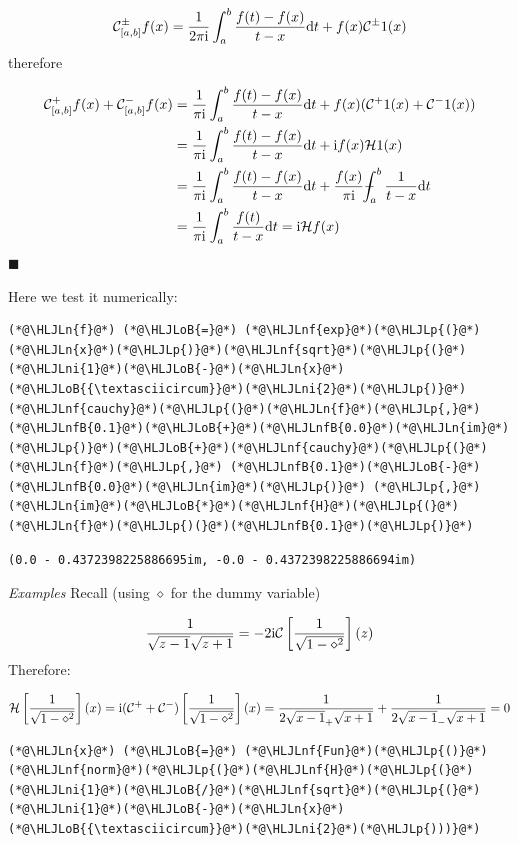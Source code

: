 \documentclass[12pt,a4paper]{article}
\newcommand{\HLJLn}[1]{#1}
\newcommand{\HLJLnf}[1]{\textcolor[RGB]{66,102,213}{#1}}
\newcommand{\HLJLnfB}[1]{\textcolor[RGB]{59,151,46}{#1}}
\newcommand{\HLJLni}[1]{\textcolor[RGB]{59,151,46}{#1}}
\newcommand{\HLJLoB}[1]{\textcolor[RGB]{102,102,102}{\textbf{#1}}}
\newcommand{\HLJLp}[1]{#1}
\def\D{ {\rm d} }
\def\I{ {\rm i} }
\def\CC{ {\cal C} }
\def\HH{ {\cal H} }
\def\Xint#1{ \mathchoice
   {\XXint\displaystyle\textstyle{#1} }%
   {\XXint\textstyle\scriptstyle{#1} }%
   {\XXint\scriptstyle\scriptscriptstyle{#1} }%
   {\XXint\scriptscriptstyle\scriptscriptstyle{#1} }%
   \!\int}
\def\XXint#1#2#3{ {\setbox0=\hbox{$#1{#2#3}{\int}$}
     \vcenter{\hbox{$#2#3$}}\kern-.5\wd0} }
\def\dashint{\Xint-}
\def\dt{\D t}
\begin{document}
\[
\CC_{[a,b]}^\pm f(x) = {1 \over 2 \pi \I} \int_a^b {f(t) - f(x) \over t-x} \dt + f(x) \CC^\pm 1(x)
\]
therefore


\begin{align*}
\CC_{[a,b]}^+ f(x) + \CC_{[a,b]}^- f(x) &= {1 \over \pi \I} \int_a^b {f(t) - f(x) \over t-x} \dt + f(x) (\CC^+ 1(x) + \CC^- 1(x) ) \\
    & = {1 \over \pi \I} \int_a^b {f(t) - f(x) \over t-x} \dt + \I  f(x) \HH 1(x)\\
    & = {1 \over \pi \I} \int_a^b {f(t) - f(x) \over t-x} \dt + {f(x)  \over \pi \I }\dashint_a^b  { 1\over t - x} \dt \\
    & = {1 \over \pi \I} \int_a^b {f(t) \over t-x} \dt =  \I \HH f(x)
\end{align*}
\ensuremath{\blacksquare}

Here we test it numerically:


\begin{lstlisting}
(*@\HLJLn{f}@*) (*@\HLJLoB{=}@*) (*@\HLJLnf{exp}@*)(*@\HLJLp{(}@*)(*@\HLJLn{x}@*)(*@\HLJLp{)}@*)(*@\HLJLnf{sqrt}@*)(*@\HLJLp{(}@*)(*@\HLJLni{1}@*)(*@\HLJLoB{-}@*)(*@\HLJLn{x}@*)(*@\HLJLoB{{\textasciicircum}}@*)(*@\HLJLni{2}@*)(*@\HLJLp{)}@*)
(*@\HLJLnf{cauchy}@*)(*@\HLJLp{(}@*)(*@\HLJLn{f}@*)(*@\HLJLp{,}@*) (*@\HLJLnfB{0.1}@*)(*@\HLJLoB{+}@*)(*@\HLJLnfB{0.0}@*)(*@\HLJLn{im}@*)(*@\HLJLp{)}@*)(*@\HLJLoB{+}@*)(*@\HLJLnf{cauchy}@*)(*@\HLJLp{(}@*)(*@\HLJLn{f}@*)(*@\HLJLp{,}@*) (*@\HLJLnfB{0.1}@*)(*@\HLJLoB{-}@*)(*@\HLJLnfB{0.0}@*)(*@\HLJLn{im}@*)(*@\HLJLp{)}@*) (*@\HLJLp{,}@*) (*@\HLJLn{im}@*)(*@\HLJLoB{*}@*)(*@\HLJLnf{H}@*)(*@\HLJLp{(}@*)(*@\HLJLn{f}@*)(*@\HLJLp{)(}@*)(*@\HLJLnfB{0.1}@*)(*@\HLJLp{)}@*)
\end{lstlisting}

\begin{lstlisting}
(0.0 - 0.4372398225886695im, -0.0 - 0.4372398225886694im)
\end{lstlisting}


\emph{Examples} Recall  (using $\diamond$ for the dummy variable)

\[
{1 \over \sqrt{z-1} \sqrt{z+1}} = -2 \I {\cal C}\left[{1 \over \sqrt{1-\diamond^2}}\right](z)
\]
Therefore:

\[
{\cal H}\left[{1 \over \sqrt{1-\diamond^2}}\right](x) = \I (\CC^+  + \CC^-) \left[{1 \over \sqrt{1-\diamond^2}}\right](x) = {1 \over 2  \sqrt{x-1}_+ \sqrt{x+1}} + {1 \over 2  \sqrt{x-1}_- \sqrt{x+1}} = 0
\]

\begin{lstlisting}
(*@\HLJLn{x}@*) (*@\HLJLoB{=}@*) (*@\HLJLnf{Fun}@*)(*@\HLJLp{()}@*)
(*@\HLJLnf{norm}@*)(*@\HLJLp{(}@*)(*@\HLJLnf{H}@*)(*@\HLJLp{(}@*)(*@\HLJLni{1}@*)(*@\HLJLoB{/}@*)(*@\HLJLnf{sqrt}@*)(*@\HLJLp{(}@*)(*@\HLJLni{1}@*)(*@\HLJLoB{-}@*)(*@\HLJLn{x}@*)(*@\HLJLoB{{\textasciicircum}}@*)(*@\HLJLni{2}@*)(*@\HLJLp{)))}@*)
\end{lstlisting}
\end{document}
